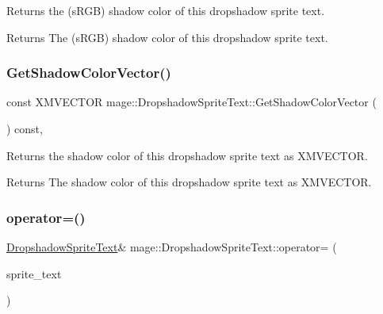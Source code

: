 Returns the (s\+R\+GB) shadow color of this dropshadow sprite text.

\begin{DoxyReturn}{Returns}
The (s\+R\+GB) shadow color of this dropshadow sprite text. 
\end{DoxyReturn}
\hypertarget{classmage_1_1_dropshadow_sprite_text_aedbd1adb15584680abebab3784905834}{}\label{classmage_1_1_dropshadow_sprite_text_aedbd1adb15584680abebab3784905834} 
\subsubsection{\texorpdfstring{Get\+Shadow\+Color\+Vector()}{GetShadowColorVector()}}
{\footnotesize\ttfamily const X\+M\+V\+E\+C\+T\+OR mage\+::\+Dropshadow\+Sprite\+Text\+::\+Get\+Shadow\+Color\+Vector (\begin{DoxyParamCaption}{ }\end{DoxyParamCaption}) const\hspace{0.3cm}{\ttfamily [private]}, {\ttfamily [noexcept]}}

Returns the shadow color of this dropshadow sprite text as {\ttfamily X\+M\+V\+E\+C\+T\+OR}.

\begin{DoxyReturn}{Returns}
The shadow color of this dropshadow sprite text as {\ttfamily X\+M\+V\+E\+C\+T\+OR}. 
\end{DoxyReturn}
\hypertarget{classmage_1_1_dropshadow_sprite_text_a83846227264396ee5b6ca44304bc404a}{}\label{classmage_1_1_dropshadow_sprite_text_a83846227264396ee5b6ca44304bc404a} 
\subsubsection{\texorpdfstring{operator=()}{operator=()}\hspace{0.1cm}{\footnotesize\ttfamily [1/2]}}
{\footnotesize\ttfamily \hyperlink{classmage_1_1_dropshadow_sprite_text}{Dropshadow\+Sprite\+Text}\& mage\+::\+Dropshadow\+Sprite\+Text\+::operator= (\begin{DoxyParamCaption}\item[{const \hyperlink{classmage_1_1_dropshadow_sprite_text}{Dropshadow\+Sprite\+Text} \&}]{sprite\+\_\+text }\end{DoxyParamCaption})\hspace{0.3cm}{\ttfamily [delete]}}

